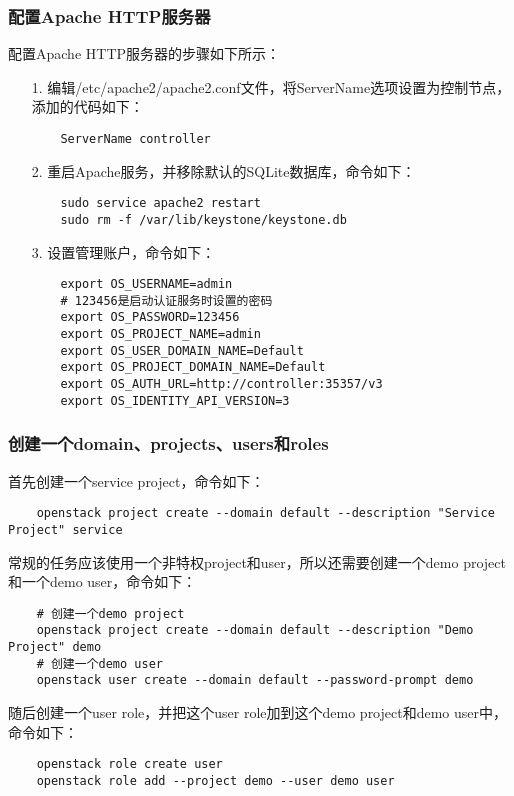 \documentclass[a4paper,left=2.5cm,right=2.5cm,11pt]{article}
\begin{document}
\subsubsection{配置Apache HTTP服务器}
	配置Apache HTTP服务器的步骤如下所示：
	\begin{itemize}
		\item[1.] 编辑/etc/apache2/apache2.conf文件，将ServerName选项设置为控制节点，添加的代码如下：
		\begin{lstlisting}
	ServerName controller
		\end{lstlisting}

		\item[2.] 重启Apache服务，并移除默认的SQLite数据库，命令如下：
		\begin{lstlisting}
	sudo service apache2 restart
	sudo rm -f /var/lib/keystone/keystone.db
		\end{lstlisting}

		\item[3.] 设置管理账户，命令如下：
		\begin{lstlisting}
	export OS_USERNAME=admin
	# 123456是启动认证服务时设置的密码
	export OS_PASSWORD=123456
	export OS_PROJECT_NAME=admin
	export OS_USER_DOMAIN_NAME=Default
	export OS_PROJECT_DOMAIN_NAME=Default
	export OS_AUTH_URL=http://controller:35357/v3
	export OS_IDENTITY_API_VERSION=3
		\end{lstlisting}
	\end{itemize}

\subsubsection{创建一个domain、projects、users和roles}
	首先创建一个service project，命令如下：
	\begin{lstlisting}
	openstack project create --domain default --description "Service Project" service
	\end{lstlisting}

	常规的任务应该使用一个非特权project和user，所以还需要创建一个demo project和一个demo user，命令如下：
	\begin{lstlisting}
	# 创建一个demo project
	openstack project create --domain default --description "Demo Project" demo
	# 创建一个demo user
	openstack user create --domain default --password-prompt demo
	\end{lstlisting}

	随后创建一个user role，并把这个user role加到这个demo project和demo user中，命令如下：
	\begin{lstlisting}
	openstack role create user
	openstack role add --project demo --user demo user
	\end{lstlisting}
	
\end{document}
